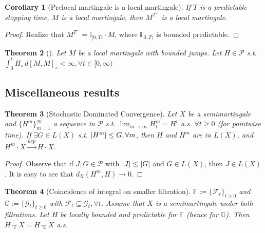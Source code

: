 \documentclass[openany,oneside]{book}
\newtheorem{thm}{Theorem}[section]
\newtheorem{cor}[thm]{Corollary}
\theoremstyle{definition}
\theoremstyle{remark}
\newcommand{\I}{\mathbb{I}} %
\DeclarePairedDelimiter{\abs}{\lvert}{\rvert} %
\newcommand{\pred}{\mathcal{P}} %
\begin{document}
\begin{cor}[Prelocal martingale is a local martingale]
If $T$ is a predictable stopping time, $M$ is a local martingale, then $M^{T^-}$ is a local martingale.
\end{cor}
\begin{proof}
Realize that $M^{T^-} = \I_{[0,T)}\cdot M$, where $\I_{[0,T)}$ is bounded predictable.
\end{proof}

\begin{thm}[]
Let $M$ be a local martingale with bounded jumps. Let $H\in\pred$ s.t. $\int_0^t H_s \,d [M,M]_s < \infty, \forall t\in[0,\infty)$
\end{thm}

\subsection{Miscellaneous results}
\begin{thm}[Stochastic Dominated Convergence]
Let $X$ be a semimartingale and $\{H^m\}_{m=1}^\infty$ a sequence in $\pred$ s.t. $\lim_{m\to\infty} H^m_t = H^t$ a.s. $\forall t\ge 0$ (for pointwise time). If $\exists G\in L(X)$ s.t. $\abs{H^m} \le G, \forall m$, then $H$ and $H^m$ are in $L(X)$, and $H^m \cdot X \xrightarrow{ucp} H\cdot X$.
\end{thm}
\begin{proof}
Observe that if $J,G\in\pred$ with $\abs{J}\le\abs{G}$ and $G\in L(X)$, then $J\in L(X)$. It is easy to see that $d_X(H^m,H) \to 0$.
\end{proof}

\begin{thm}[Coincidence of integral on smaller filtration]
$\mathbb{F}:=\{\mathcal{F}_t\}_{t\ge 0}$ and $\mathbb{G}:=\{\mathcal{G}_t\}_{t\ge 0}$ with $\mathcal{F}_t \subseteq \mathcal{G}_t, \forall t$. Assume that $X$ is a semimartingale under both filtrations. Let $H$ be locally bounded and predictable for $\mathbb{F}$ (hence for $\mathbb{G}$). Then $H\cdot_{\mathbb{F}} X = H\cdot_{\mathbb{G}} X$ a.s.
\end{thm}
\end{document}
